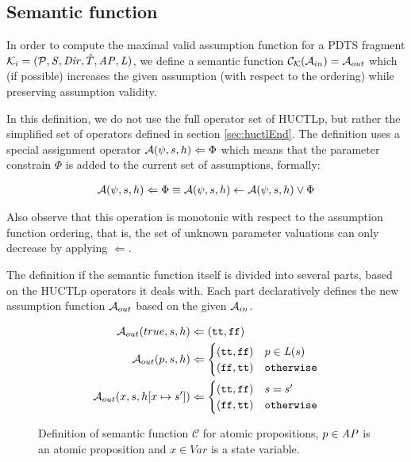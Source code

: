 \subsection{Semantic function}
\label{sec:semantic}

In order to compute the maximal valid assumption function for a \ac{PDTS} fragment $\mathcal{K}_i = (\mathcal{P}, \mathit{S}, \mathit{Dir}, \hat{T}, \mathit{AP}, \mathit{L})$, we define a semantic function $\mathcal{C}_\mathcal{K}(\mathcal{A}_{in}) = \mathcal{A}_{out}$ which (if possible) increases the given assumption (with respect to the ordering) while preserving assumption validity.

In this definition, we do not use the full operator set of \ac{HUCTLp}, but rather the simplified set of operators defined in section \ref{sec:huctlEnd}. The definition uses a special assignment operator $\mathcal{A}(\psi, s, h) \Leftarrow \Phi$ which means that the parameter constrain $\Phi$ is added to the current set of assumptions, formally:

\begin{align*}
	\mathcal{A}(\psi, s, h) \Leftarrow \Phi \equiv \mathcal{A}(\psi, s, h) \gets \mathcal{A}(\psi, s, h) \lor \Phi
\end{align*}

Also observe that this operation is monotonic with respect to the assumption function ordering, that is, the set of unknown parameter valuations can only decrease by applying $\Leftarrow$.

The definition if the semantic function itself is divided into several parts, based on the \ac{HUCTLp} operators it deals with. Each part declaratively defines the new assumption function $\mathcal{A}_{out}$ based on the given $\mathcal{A}_{in}$.

\begin{figure}
	\begin{align*}
	\mathcal{A}_{out}(true, s, h) & \Leftarrow (\texttt{tt}, \texttt{ff}) \\
	\mathcal{A}_{out}(p, s, h) & \Leftarrow 
	\begin{cases}
	(\texttt{tt}, \texttt{ff}) & p \in \mathit{L}(s) \\
	(\texttt{ff}, \texttt{tt}) & \texttt{otherwise} \\
	\end{cases}
	\\
	\mathcal{A}_{out}(x, s, h[ x \mapsto s' ]) & \Leftarrow
	\begin{cases}
	(\texttt{tt}, \texttt{ff}) & s = s' \\
	(\texttt{ff}, \texttt{tt}) & \texttt{otherwise}
	\end{cases}
	\\
	\end{align*}
	
	\caption{Definition of semantic function $\mathcal{C}$ for atomic propositions, $p \in \mathit{AP}$ is an atomic proposition and $x \in Var$ is a state variable.}
	\label{fig:assProp}
\end{figure}

